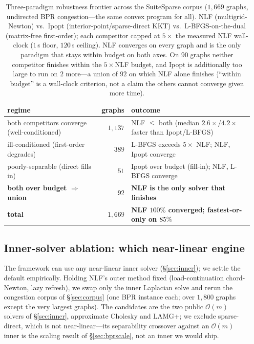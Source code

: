\documentclass{siamart220329}
\newcommand{\Om}{\mathcal{O}(m)}
\begin{document}
\begin{table}[t]\centering\small
\caption{Three-paradigm robustness frontier across the SuiteSparse corpus ($1{,}669$ graphs, undirected
BPR congestion---the same convex program for all). NLF (multigrid-Newton) vs.\ Ipopt
(interior-point/sparse-direct KKT) vs.\ L-BFGS-on-the-dual (matrix-free first-order); each competitor
capped at $5\times$ the measured NLF wall-clock ($1$\,s floor, $120$\,s ceiling). NLF converges on every
graph and is the only paradigm that stays within budget on both axes. On $90$ graphs neither competitor
finishes within the $5\times$NLF budget, and Ipopt is additionally too large to run on $2$ more---a
union of $92$ on which NLF alone finishes (``within budget'' is a wall-clock criterion, not a claim the
others cannot converge given more time).
}\label{tab:robustness}
\begin{tabular}{p{} r p{}}
\toprule
regime & graphs & outcome\\
\midrule
both competitors converge (well-conditioned) & $1{,}137$ & NLF $\le$ both (median $2.6\times$/$4.2\times$ faster than Ipopt/L-BFGS)\\
ill-conditioned (first-order degrades) & $389$ & L-BFGS exceeds $5\times$ NLF; NLF, Ipopt converge\\
poorly-separable (direct fills in) & $51$ & Ipopt over budget (fill-in); NLF, L-BFGS converge\\
\textbf{both over budget $\Rightarrow$ union} & \textbf{$92$} & \textbf{NLF is the only solver that finishes}\\
\midrule
\textbf{total} & \textbf{$1{,}669$} & \textbf{NLF $100\%$ converged; fastest-or-only on $85\%$}\\
\bottomrule
\end{tabular}
\end{table}

\subsection{Inner-solver ablation: which near-linear engine}\label{sec:ablation}
The framework can use any near-linear inner solver (\S\ref{sec:inner}); we settle the
default empirically. Holding NLF's outer method fixed (load-continuation chord-Newton, lazy refresh),
we swap only the inner Laplacian solve and rerun the congestion corpus of
\S\ref{sec:corpus} (one BPR instance each; over $1{,}800$ graphs except the very largest graphs). The candidates are the two
public $\Om$ solvers of \S\ref{sec:inner}, approximate Cholesky and LAMG+; we exclude sparse-direct,
which is not near-linear---its separability crossover against an $\Om$ inner is the scaling result of
\S\ref{sec:bprscale}, not an inner we would ship.
\end{document}
